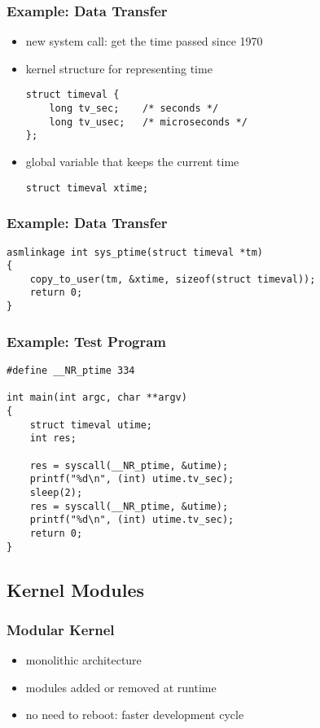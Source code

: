\documentclass[dvipsnames]{beamer}
\begin{document}
\begin{frame}[fragile]
  \frametitle{Example: Data Transfer}

  \begin{itemize}
    \item new system call: get the time passed since 1970

    \medskip
    \item kernel structure for representing time
    \begin{lstlisting}
struct timeval {
    long tv_sec;    /* seconds */
    long tv_usec;   /* microseconds */
};
    \end{lstlisting}

    \medskip
    \item global variable that keeps the current time
    \begin{lstlisting}
struct timeval xtime;
    \end{lstlisting}
  \end{itemize}
\end{frame}

\begin{frame}[fragile]
  \frametitle{Example: Data Transfer}

  \begin{lstlisting}
asmlinkage int sys_ptime(struct timeval *tm)
{
    copy_to_user(tm, &xtime, sizeof(struct timeval));
    return 0;
}
  \end{lstlisting}
\end{frame}

\begin{frame}[fragile]
  \frametitle{Example: Test Program}

  \begin{lstlisting}
#define __NR_ptime 334

int main(int argc, char **argv)
{
    struct timeval utime;
    int res;

    res = syscall(__NR_ptime, &utime);
    printf("%d\n", (int) utime.tv_sec);
    sleep(2);
    res = syscall(__NR_ptime, &utime);
    printf("%d\n", (int) utime.tv_sec);
    return 0;
}
  \end{lstlisting}
\end{frame}

\subsection{Kernel Modules}

\begin{frame}
  \frametitle{Modular Kernel}

  \begin{itemize}
    \item monolithic architecture
    \item modules added or removed at runtime

    \medskip
    \item no need to reboot: faster development cycle
  \end{itemize}
\end{frame}
\end{document}
